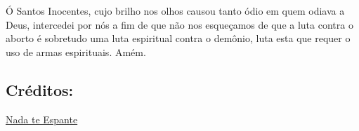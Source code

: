 \documentclass[11pt]{article}
\begin{document}
Ó Santos Inocentes, cujo brilho nos olhos causou tanto ódio em quem odiava a Deus, intercedei por nós a fim de que não nos esqueçamos de que a luta contra o aborto é sobretudo uma luta espiritual contra o demônio, luta esta que requer o uso de armas espirituais. Amém.


\subsection*{Créditos:}
\href{https://www.nadateespante.com/products/novena-aos-santos-inocentes/}{Nada te Espante}
\end{document}
